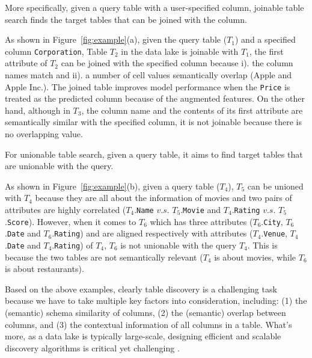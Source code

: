 More specifically, given a query table with a user-specified column, joinable table search finds the target tables that can be joined with the column.

\begin{example}
	As shown in Figure~\ref{fig:example}(a), given the query table ($T_1$) and a specified column \texttt{Corporation}, Table $T_2$ in the data lake is joinable with $T_1$, \ie the first attribute of $T_2$ can be joined with the specified column because i). the column names match and ii). a number of cell values semantically overlap (\eg Apple and Apple Inc.). 
	The joined table improves model performance when the \texttt{Price} is treated as the predicted column because of the augmented features.
	On the other hand, although in $T_3$, the column name and the contents of its first attribute are semantically similar with the specified column, it is not joinable because there is no overlapping value.
\end{example}

For unionable table search, given a query table, it aims to find target tables that are unionable with the query.                  

\begin{example}
	As shown in Figure~\ref{fig:example}(b), given a query table ($T_4$), $T_5$ can be unioned with $T_4$ because they are all about the information of movies and two pairs of attributes are highly correlated ($T_4$.\texttt{Name} $v.s.$ $T_5$.\texttt{Movie} and $T_4$.\texttt{Rating} $v.s.$ $T_5$.\texttt{Score}). 
	However, when it comes to $T_6$ which has three attributes ($T_6$.\texttt{City}, $T_6$.\texttt{Date} and $T_6$.\texttt{Rating}) and are aligned respectively with attributes ($T_4$.\texttt{Venue}, $T_4$.\texttt{Date} and $T_4$.\texttt{Rating}) of $T_4$,  $T_6$ is not unionable with the query $T_4$. This is because the two tables are not semantically relevant ($T_4$ is about movies, while $T_6$ is about restaurants).
\end{example}

Based on the above examples, clearly table discovery is a challenging task because we have to take multiple key factors into consideration, including: (1) the (semantic) schema similarity of columns, (2) the (semantic) overlap between columns, and (3) the contextual information of all columns in a table. 
What's more, as a data lake is typically large-scale, designing efficient and scalable discovery algorithms is critical yet challenging .

